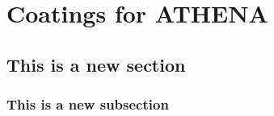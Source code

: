 \chapter{Coatings for ATHENA}
\section{This is a new section}
\subsection{This is a new subsection}
